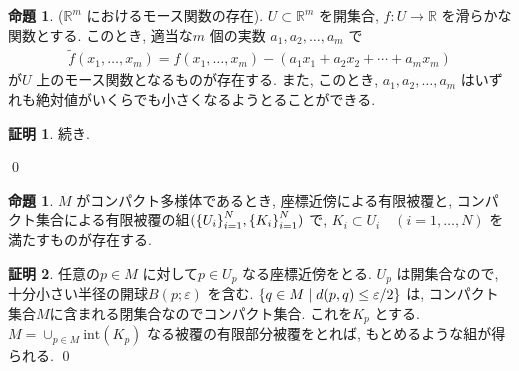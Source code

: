 \documentclass[10pt, fleqn, label-section=none]{bxjsarticle}
\theoremstyle{definition}
\newtheorem{prop}[dfn]{命題}
\newtheorem*{pf*}{証明}
\newcommand{\veps}{\varepsilon}
\newcommand{\cbra}[1]{\mleft\{#1\mright\}}
\renewcommand{\;}{\, ; \,}
\newenvironment{claim}[1]{\par\noindent\underline{step:}\space#1}{}
\newenvironment{claimproof}[1]{\par\noindent{($\because$)}\space#1}{\hfill $\blacktriangle $}
\begin{document}
\begin{prop}($\mathbb R^m $ におけるモース関数の存在). $U \subset \mathbb R^m$ を開集合, $f: U \rightarrow \mathbb R$ を滑らかな関数とする. このとき, 適当な$m$ 個の実数 $a_1, a_2, \ldots, a_m$ で
\begin{align*} \tilde f(x_1, \ldots, x_m) = f(x_1, \ldots, x_m) - (a_1 x_1 + a_2 x_2 + \cdots + a_m x_m)  \end{align*}
が$U$ 上のモース関数となるものが存在する. また, このとき, $a_1, a_2, \ldots, a_m$ はいずれも絶対値がいくらでも小さくなるようとることができる. 
\end{prop}
\begin{pf*}

続き. 

\qed
\end{pf*}




\begin{prop}
$M$ がコンパクト多様体であるとき, 座標近傍による有限被覆と, コンパクト集合による有限被覆の組$(\cbra{U_i}_{i= 1} ^N , \cbra{K_i}_{i = 1} ^ N)$ で, $K_i \subset U_i \quad (i = 1, \ldots , N)$ を満たすものが存在する. 
\end{prop}
\begin{pf*}
任意の$p \in M$ に対して$p \in U_p$ なる座標近傍をとる. $U_p$ は開集合なので, 十分小さい半径の開球$B(p; \veps)$ を含む.  $\cbra{q \in M \mid d(p,q ) \leq \veps/2}$ は, コンパクト集合$M$に含まれる閉集合なのでコンパクト集合. これを$K_p$ とする. $M = \cup_{p \in M } \textrm{int} (K_p)$ なる被覆の有限部分被覆をとれば, もとめるような組が得られる. 
\qed
\end{pf*}
\end{document}
